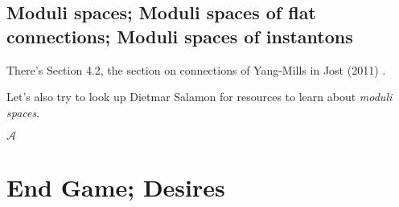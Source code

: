 \documentclass[10pt]{amsart}
\begin{document}
\begin{multicols}{2}
\subsection{Moduli spaces; Moduli spaces of flat connections; Moduli spaces of instantons}

There's Section 4.2, the section on connections of Yang-Mills in Jost (2011) \cite{JJost2011}.  

Let's also try to look up Dietmar Salamon for resources to learn about \emph{moduli spaces}.  

$\mathcal{A}$

\section{End Game; Desires}








\end{multicols}
\end{document}
